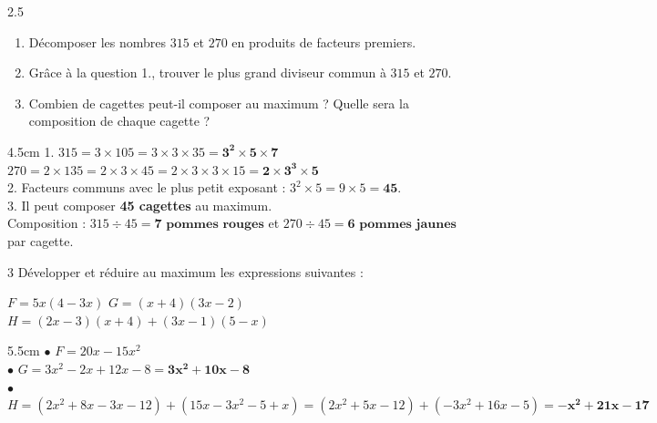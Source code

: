 \documentclass[a4paper]{book}
\begin{document}
{    
    \begin{exerciceNote}{2.5}
        \begin{enumerate}
            \item Décomposer les nombres $315$ et $270$ en produits de facteurs premiers.
            \item Grâce à la question 1., trouver le plus grand diviseur commun à $315$ et $270$.
            \item Combien de cagettes peut-il composer au maximum ? Quelle sera la composition de chaque cagette ?
        \end{enumerate}
        \begin{ZoneReponse}{4.5cm}
        1. $315 = 3 \times 105 = 3 \times 3 \times 35 = \mathbf{3^2 \times 5 \times 7}$ \\
        \phantom{1. }$270 = 2 \times 135 = 2 \times 3 \times 45 = 2 \times 3 \times 3 \times 15 = \mathbf{2 \times 3^3 \times 5}$ \\
        2. Facteurs communs avec le plus petit exposant : $3^2 \times 5 = 9 \times 5 = \mathbf{45}$. \\
        3. Il peut composer \textbf{45 cagettes} au maximum. \\
        \phantom{3. }Composition : $315 \div 45 = \mathbf{7\text{ pommes rouges}}$ et $270 \div 45 = \mathbf{6\text{ pommes jaunes}}$ par cagette.
        \end{ZoneReponse}
    \end{exerciceNote}

    
    \begin{exerciceNote}{3}
        Développer et réduire au maximum les expressions suivantes :
        \medskip
        
        $F = 5x(4 - 3x)$ \quad $G = (x + 4)(3x - 2)$ \quad $H = (2x - 3)(x + 4) + (3x - 1)(5 - x)$
        
        \begin{ZoneReponse}{5.5cm}
            $\bullet$ $F = 20x - 15x^2$ \\
            $\bullet$ $G = 3x^2 - 2x + 12x - 8 = \mathbf{3x^2 + 10x - 8}$ \\
            $\bullet$ $H = (2x^2 + 8x - 3x - 12) + (15x - 3x^2 - 5 + x) = (2x^2 + 5x - 12) + (-3x^2 + 16x - 5) = \mathbf{-x^2 + 21x - 17}$
        \end{ZoneReponse}
    \end{exerciceNote}
    
}
\end{document}
